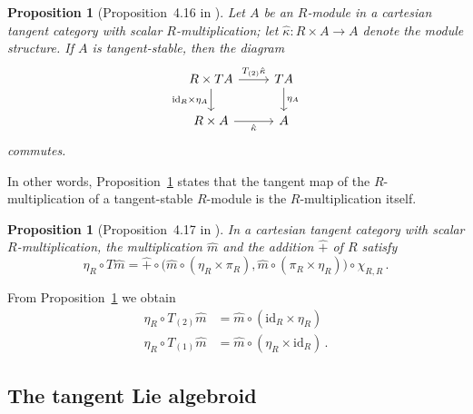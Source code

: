 \documentclass[12pt,reqno, a4paper]{amsart}
\numberwithin{equation}{section}
\theoremstyle{plain}
\newtheorem{Proposition}[Theorem]{Proposition}
\theoremstyle{definition}
\newtheorem{Remark}[Theorem]{Remark}
\theoremstyle{remark}
\newcommand{\id}{\mathrm{id}}
\newcommand{\Val}{\eta}
\newcommand{\Rmult}{\hat{m}}
\newcommand{\Radd}{\hat{+}}
\newcommand{\Amod}{\hat{\kappa}}
\newcommand{\Tpart}[1]{T_{(#1)}}
\begin{document}

\begin{Proposition}[Proposition~4.16 in \cite{AintablianBlohmann:2026}]
\label{prop:RmodLinearization}
Let $A$ be an $R$-module in a cartesian tangent category with scalar $R$-multiplication; let $\Amod: R \times A \to A$ denote the module structure. If $A$ is tangent-stable, then the diagram
\begin{equation*}
\begin{tikzcd}
R \times TA
\ar[r, "\Tpart{2} \Amod"]
\ar[d, "\id_R \times \Val_A"']
&
TA
\ar[d, "\Val_A"]
\\
R \times A
\ar[r, "\Amod"']
&
A
\end{tikzcd}
\end{equation*}
commutes.
\end{Proposition}
In other words, Proposition~\ref{prop:RmodLinearization} states that the tangent map of the $R$-multiplication of a tangent-stable $R$-module is the $R$-multiplication itself.

\begin{Proposition}[Proposition~4.17 in \cite{AintablianBlohmann:2026}]
\label{prop:LeibnizRuleR}
In a cartesian tangent category with scalar $R$-multiplication, the multiplication $\Rmult$ and the addition $\Radd$ of $R$ satisfy
\begin{equation*}
  \Val_R \circ T\Rmult
  =
  \Radd \circ \bigl( \Rmult \circ (\Val_R \times \pi_R),
  \Rmult \circ (\pi_R \times \Val_R) \bigr)
  \circ \chi_{R,R}
  \,.
\end{equation*}
\end{Proposition}

From Proposition~\ref{prop:RmodLinearization} we obtain
\begin{align}
\label{eq:LeibnizRuleR1}
  \Val_R \circ \Tpart{2} \Rmult
  &= \Rmult \circ (\id_R \times \Val_R)
  \\
\label{eq:LeibnizRuleR2}
  \Val_R \circ \Tpart{1} \Rmult
  &= \Rmult \circ (\Val_R \times \id_R)
  \,.
\end{align}



\subsection{The tangent Lie algebroid}
\end{document}
